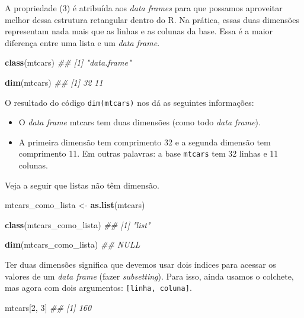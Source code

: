 \documentclass[]{book}
\newenvironment{Shaded}{\begin{snugshade}}{\end{snugshade}}
\newcommand{\CommentTok}[1]{\textcolor[rgb]{0.56,0.35,0.01}{\textit{#1}}}
\newcommand{\DecValTok}[1]{\textcolor[rgb]{0.00,0.00,0.81}{#1}}
\newcommand{\KeywordTok}[1]{\textcolor[rgb]{0.13,0.29,0.53}{\textbf{#1}}}
\newcommand{\NormalTok}[1]{#1}
\newcommand{\StringTok}[1]{\textcolor[rgb]{0.31,0.60,0.02}{#1}}
\begin{document}
A propriedade (3) é atribuída aos \emph{data frames} para que possamos aproveitar melhor dessa estrutura retangular dentro do R. Na prática, essas duas dimensões representam nada mais que as linhas e as colunas da base. Essa é a maior diferença entre uma lista e um \emph{data frame}.

\begin{Shaded}
\begin{Highlighting}[]
\KeywordTok{class}\NormalTok{(mtcars)}
\CommentTok{## [1] "data.frame"}

\KeywordTok{dim}\NormalTok{(mtcars)}
\CommentTok{## [1] 32 11}
\end{Highlighting}
\end{Shaded}

O resultado do código \texttt{dim(mtcars)} nos dá as seguintes informações:

\begin{itemize}
\item
  O \emph{data frame} mtcars tem duas dimensões (como todo \emph{data frame}).
\item
  A primeira dimensão tem comprimento 32 e a segunda dimensão tem comprimento 11. Em outras palavras: a base \texttt{mtcars} tem 32 linhas e 11 colunas.
\end{itemize}

Veja a seguir que listas não têm dimensão.

\begin{Shaded}
\begin{Highlighting}[]
\NormalTok{mtcars_como_lista <-}\StringTok{ }\KeywordTok{as.list}\NormalTok{(mtcars)}

\KeywordTok{class}\NormalTok{(mtcars_como_lista)}
\CommentTok{## [1] "list"}

\KeywordTok{dim}\NormalTok{(mtcars_como_lista)}
\CommentTok{## NULL}
\end{Highlighting}
\end{Shaded}

Ter duas dimensões significa que devemos usar dois índices para acessar os valores de um \emph{data frame} (fazer \emph{subsetting}). Para isso, ainda usamos o colchete, mas agora com dois argumentos: \texttt{{[}linha,\ coluna{]}}.

\begin{Shaded}
\begin{Highlighting}[]
\NormalTok{mtcars[}\DecValTok{2}\NormalTok{, }\DecValTok{3}\NormalTok{]}
\CommentTok{## [1] 160}
\end{Highlighting}
\end{Shaded}
\end{document}
